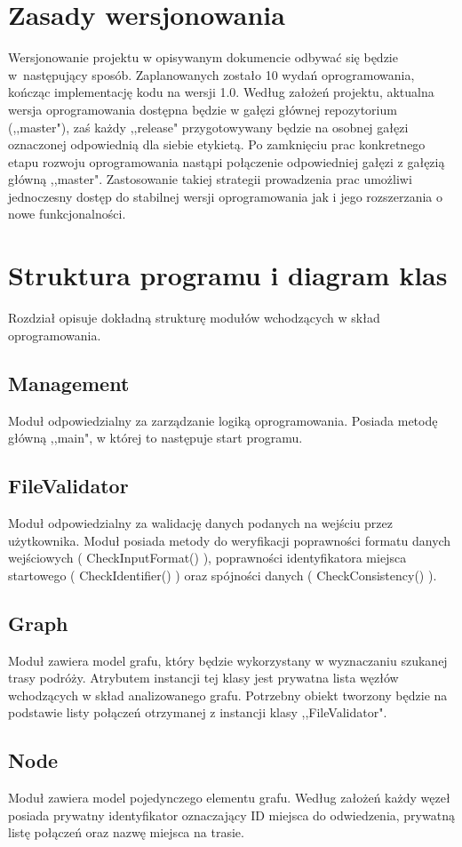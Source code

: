 \documentclass[10pt,oneside]{article}
\begin{document}
\section{Zasady wersjonowania}
Wersjonowanie projektu w opisywanym dokumencie odbywać się będzie w~następujący sposób. Zaplanowanych zostało 10 wydań oprogramowania, kończąc implementację kodu na wersji 1.0. Według założeń projektu, aktualna wersja oprogramowania dostępna będzie w gałęzi głównej repozytorium (,,master"), zaś każdy ,,release" przygotowywany będzie na osobnej gałęzi oznaczonej odpowiednią dla siebie etykietą. Po zamknięciu prac konkretnego etapu rozwoju oprogramowania nastąpi połączenie odpowiedniej gałęzi z gałęzią główną ,,master". Zastosowanie takiej strategii prowadzenia prac umożliwi jednoczesny dostęp do stabilnej wersji oprogramowania jak i jego rozszerzania o nowe funkcjonalności.

\section{Struktura programu i diagram klas}
Rozdział opisuje dokładną strukturę modułów wchodzących w skład oprogramowania.

\subsection{Management}
Moduł odpowiedzialny za zarządzanie logiką oprogramowania. Posiada metodę główną ,,main", w której to następuje start programu.
\subsection{FileValidator}
Moduł odpowiedzialny za walidację danych podanych na wejściu przez użytkownika. Moduł posiada metody do weryfikacji poprawności formatu danych wejściowych ( CheckInputFormat() ), poprawności identyfikatora miejsca startowego ( CheckIdentifier() ) oraz spójności danych ( CheckConsistency() ).
\subsection{Graph}
Moduł zawiera model grafu, który będzie wykorzystany w wyznaczaniu szukanej trasy podróży. Atrybutem instancji tej klasy jest prywatna lista węzłów wchodzących w skład analizowanego grafu. Potrzebny obiekt tworzony będzie na podstawie listy połączeń otrzymanej z instancji klasy ,,FileValidator".
\subsection{Node}
Moduł zawiera model pojedynczego elementu grafu. Według założeń każdy węzeł posiada prywatny identyfikator oznaczający ID miejsca do odwiedzenia, prywatną listę połączeń oraz nazwę miejsca na trasie. 
\end{document}
